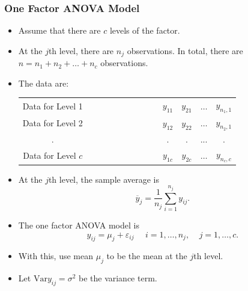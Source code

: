 \begin{frame}[shrink=2]
 \frametitle{One Factor ANOVA Model}
   \begin{itemize}
    \item Assume that there are $c$ levels of the factor.
    \item At the $j$th level, there are $n_j$ observations. In
    total, there are $n=n_{1}+n_{2}+\ldots +n_{c}$ observations.
    \item The data are:
\begin{center}
\begin{tabular}{cccccc}
Data for Level 1 & \ \ \ \ \ \ \ \ \ \ \ \ \ \ \  & $y_{11}$ &
$y_{21}$ & $
\ldots $ & $y_{n_1,1}$ \\
Data for Level 2 &  & $y_{12}$ & $y_{22}$ & $\ldots $ & $y_{n_2,1}$ \\
. &  & $.$ & $.$ & $...$ & $.$ \\
Data for Level $c$ &  & $y_{1c}$ & $y_{2c}$ & $\ldots $ &
$y_{n_c,c}$
\end{tabular}
\end{center}
\item At the $j$th level, the sample average is
\begin{equation*}
\overline{y}_{j}=\frac{1}{n_{j}}\sum_{i=1}^{n_{j}}y_{ij}.
\end{equation*}
\item The one factor ANOVA model is
\begin{equation*}
y_{ij}=\mu _{j}+ \varepsilon_{ij}\ \ \ \ \ \ i=1,\ldots ,n_{j},\ \ \
\ \ j=1,\ldots ,c.
\end{equation*}
\item With this, use mean $\mu_j$ to be the mean at the $j$th level.
\item Let $\mathrm{Var} y_{ij} = \sigma^2$ be the variance term.
  \end{itemize}
    \end{frame}

